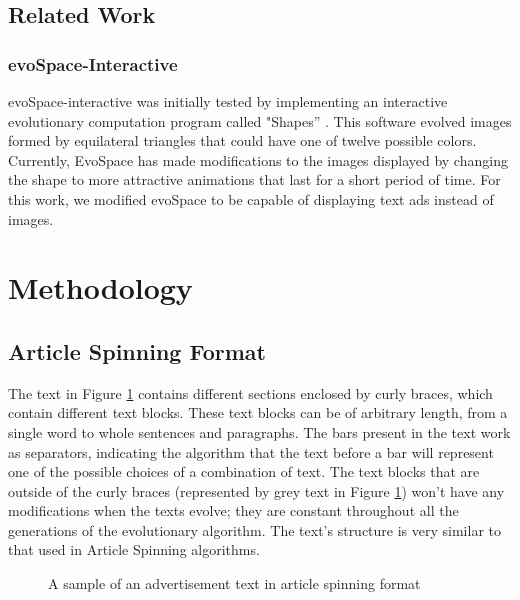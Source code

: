 \documentclass{acm_proc_article-sp}
\begin{document}
\subsection{Related Work}
\label{RelatedWork}

\subsubsection{evoSpace-Interactive}

evoSpace-interactive was initially tested by implementing an
interactive evolutionary computation program called "Shapes''
\cite{garcia2013evospace}. This software evolved images formed by equilateral
triangles that could have one of twelve possible colors. Currently,
EvoSpace has made modifications to the images displayed by changing
the shape to more attractive animations that last for a short period
of time. For this work, we modified evoSpace to be capable of
displaying text ads instead of images.

\section{Methodology}

\subsection{Article Spinning Format}
\label{ArticleSpinning}

The text in Figure \ref{PicArticleSpinning} contains different sections enclosed by curly
braces, which contain different text blocks. These text blocks can be of
arbitrary length, from a single word to whole sentences and
paragraphs. The bars present in the text work as separators,
indicating the algorithm that the text before a bar will represent one
of the possible choices of a combination of text. The text blocks that are outside of
the curly braces (represented by grey text in Figure \ref{PicArticleSpinning}) won't have any
modifications when the texts evolve; they are constant throughout all
the generations of the evolutionary algorithm. The text's structure is very
similar to that used in Article Spinning algorithms.

\begin{figure}
  \centering
  \caption{A sample of an advertisement text in article spinning format}
  \label{PicArticleSpinning}
\end{figure}
\end{document}
